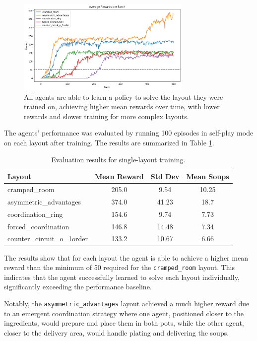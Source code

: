 \documentclass{article}
\begin{document}
\begin{figure}[ht]
\centering
\includegraphics[width=0.75\textwidth]{../plots/mean_rewards.png}
\caption{All agents are able to learn a policy to solve the layout they were trained on, achieving higher mean rewards over time, with lower rewards and slower training for more complex layouts.}
\label{fig:single_layout_rewards}
\end{figure}

The agents' performance was evaluated by running 100 episodes in self-play mode on each layout after training. The results are summarized in Table \ref{tab:single_layout_results}.

\begin{table}[ht]
\centering
\caption{Evaluation results for single-layout training.}
\label{tab:single_layout_results}
\begin{tabular}{lccc}
\toprule
Layout & \multicolumn{1}{c}{Mean Reward} & \multicolumn{1}{c}{Std Dev} & \multicolumn{1}{c}{Mean Soups} \\
\midrule
cramped\_room & 205.0 & 9.54 & 10.25 \\
asymmetric\_advantages & 374.0 & 41.23 & 18.7 \\
coordination\_ring & 154.6 & 9.74 & 7.73 \\
forced\_coordination & 146.8 & 14.48 & 7.34 \\
counter\_circuit\_o\_1order & 133.2 & 10.67 & 6.66 \\
\bottomrule
\end{tabular}
\end{table}

The results show that for each layout the agent is able to achieve a higher mean reward than the minimum of 50 required for the \texttt{cramped\_room} layout. This indicates that the agent successfully learned to solve each layout individually, significantly exceeding the performance baseline.

Notably, the \texttt{asymmetric\_advantages} layout achieved a much higher reward due to an emergent coordination strategy where one agent, positioned closer to the ingredients, would prepare and place them in both pots, while the other agent, closer to the delivery area, would handle plating and delivering the soups.
\end{document}
